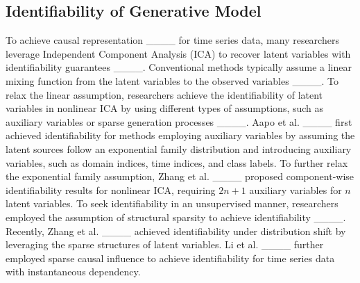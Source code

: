 \subsection{Identifiability of Generative Model}
To achieve causal representation ____ for time series data, many researchers leverage Independent Component Analysis (ICA) to recover latent variables with identifiability guarantees ____. Conventional methods typically assume a linear mixing function from the latent variables to the observed variables ____. To relax the linear assumption, researchers achieve the identifiability of latent variables in nonlinear ICA by using different types of assumptions, such as auxiliary variables or sparse generation processes ____. Aapo et al. ____ first achieved identifiability for methods employing auxiliary variables by assuming the latent sources follow an exponential family distribution and introducing auxiliary variables, such as domain indices, time indices, and class labels. To further relax the exponential family assumption, Zhang et al. ____ proposed component-wise identifiability results for nonlinear ICA, requiring $2n+1$ auxiliary variables for $n$ latent variables. To seek identifiability in an unsupervised manner, researchers employed the assumption of structural sparsity to achieve identifiability ____. Recently, Zhang et al. ____ achieved identifiability under distribution shift by leveraging the sparse structures of latent variables. Li et al. ____ further employed sparse causal influence to achieve identifiability for time series data with instantaneous dependency.



